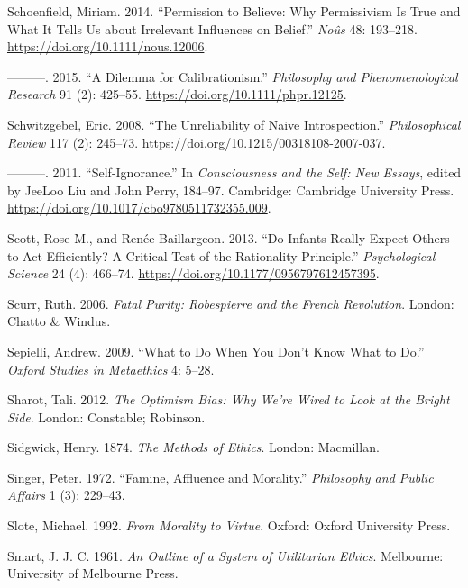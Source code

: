 \documentclass[
  10pt,
  letterpaper,
  twoside]{scrbook}
\newlength{\cslhangindent}
\newenvironment{CSLReferences}[2] %
 {\begin{list}{}{%
  \setlength{\itemindent}{0pt}
  \setlength{\leftmargin}{0pt}
  \setlength{\parsep}{0pt}
  \ifodd #1
   \setlength{\leftmargin}{\cslhangindent}
   \setlength{\itemindent}{-1\cslhangindent}
  \fi
  \setlength{\itemsep}{#2\baselineskip}}}
 {\end{list}}
\begin{document}
\begin{CSLReferences}{1}{0}
Schoenfield, Miriam. 2014. {``Permission to Believe: Why Permissivism Is
True and What It Tells Us about Irrelevant Influences on Belief.''}
\emph{No{û}s} 48: 193--218. \url{https://doi.org/10.1111/nous.12006}.

---------. 2015. {``A Dilemma for Calibrationism.''} \emph{Philosophy
and Phenomenological Research} 91 (2): 425--55.
\url{https://doi.org/10.1111/phpr.12125}.

Schwitzgebel, Eric. 2008. {``The Unreliability of Naive
Introspection.''} \emph{Philosophical Review} 117 (2): 245--73.
\url{https://doi.org/10.1215/00318108-2007-037}.

---------. 2011. {``Self-Ignorance.''} In \emph{Consciousness and the
Self: New Essays}, edited by JeeLoo Liu and John Perry, 184--97.
Cambridge: Cambridge University Press.
\url{https://doi.org/10.1017/cbo9780511732355.009}.

Scott, Rose M., and Renée Baillargeon. 2013. {``Do Infants Really Expect
Others to Act Efficiently? A Critical Test of the Rationality
Principle.''} \emph{Psychological Science} 24 (4): 466--74.
\url{https://doi.org/10.1177/0956797612457395}.

Scurr, Ruth. 2006. \emph{Fatal Purity: Robespierre and the French
Revolution}. London: Chatto \& Windus.

Sepielli, Andrew. 2009. {``What to Do When You Don't Know What to Do.''}
\emph{Oxford Studies in Metaethics} 4: 5--28.

Sharot, Tali. 2012. \emph{The Optimism Bias: Why We're Wired to Look at
the Bright Side}. London: Constable; Robinson.

Sidgwick, Henry. 1874. \emph{The Methods of Ethics}. London: Macmillan.

Singer, Peter. 1972. {``Famine, Affluence and Morality.''}
\emph{Philosophy and Public Affairs} 1 (3): 229--43.

Slote, Michael. 1992. \emph{From Morality to Virtue}. Oxford: Oxford
University Press.

Smart, J. J. C. 1961. \emph{An Outline of a System of Utilitarian
Ethics}. Melbourne: University of Melbourne Press.


\end{CSLReferences}
\end{document}
